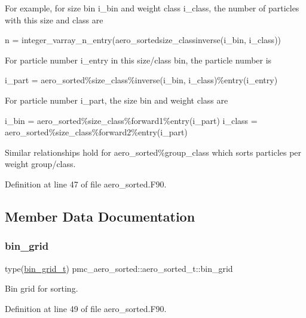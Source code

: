 For example, for size bin {\ttfamily i\+\_\+bin} and weight class {\ttfamily i\+\_\+class}, the number of particles with this size and class are 
\begin{DoxyPre}
 n = integer\_varray\_n\_entry(aero\_sortedsize\_classinverse(i\_bin, i\_class))
 \end{DoxyPre}
 For particle number {\ttfamily i\+\_\+entry} in this size/class bin, the particle number is 
\begin{DoxyPre}
 i\_part = aero\_sorted\%size\_class\%inverse(i\_bin, i\_class)\%entry(i\_entry)
 \end{DoxyPre}
 For particle number {\ttfamily i\+\_\+part}, the size bin and weight class are 
\begin{DoxyPre}
 i\_bin = aero\_sorted\%size\_class\%forward1\%entry(i\_part)
 i\_class = aero\_sorted\%size\_class\%forward2\%entry(i\_part)
 \end{DoxyPre}


Similar relationships hold for {\ttfamily aero\+\_\+sorted\%group\+\_\+class} which sorts particles per weight group/class. 

Definition at line 47 of file aero\+\_\+sorted.\+F90.



\subsection{Member Data Documentation}
\mbox{\label{structpmc__aero__sorted_1_1aero__sorted__t_a24abbe3d25ce85ae642a5b8a7b4fb8c4}} 
\subsubsection{\texorpdfstring{bin\+\_\+grid}{bin\_grid}}
{\footnotesize\ttfamily type(\mbox{\hyperlink{structpmc__bin__grid_1_1bin__grid__t}{bin\+\_\+grid\+\_\+t}}) pmc\+\_\+aero\+\_\+sorted\+::aero\+\_\+sorted\+\_\+t\+::bin\+\_\+grid}



Bin grid for sorting. 



Definition at line 49 of file aero\+\_\+sorted.\+F90.

